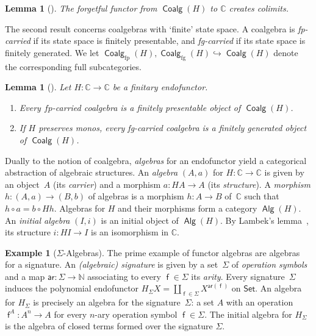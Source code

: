 \documentclass[10pt,a4paper]{article}
\newtheorem{lemma}[theorem]{Lemma}
\theoremstyle{definition}
\newtheorem{example}[theorem]{Example}
\theoremstyle{remark}
\numberwithin{equation}{section}
\providecommand{\catname}{\mathsf}
\providecommand{\oname}[1]{{\mathop{\mathsf{#1}}\xspace}}
\def\Set{\catname{Set}}
\newcommand{\ar}{\mathsf{ar}}
\providecommand{\C}{}
\newcommand{\fp}{{\mathrm{fp}}}
\newcommand{\fg}{{\mathrm{fg}}}
\renewcommand{\C}{{\mathbb{C}}}
\newcommand{\Nat}{\mathds{N}}
\newcommand{\f}{\oname{f}}
\DeclareMathOperator{\Coalg}{\mathsf{Coalg}}
\DeclareMathOperator{\Alg}{\mathsf{Alg}}
\newcommand{\subto}{\hookrightarrow}
\renewcommand{\Nat}{\mathbb{N}}
\newcommand{\gcat}{\mathbb{C}}
\newcommand{\resetCurThmBraces}{  \gdef\curThmBraceOpen{(}  \gdef\curThmBraceClose{)}}
\newcommand{\removeThmBraces}{  \gdef\curThmBraceOpen{}  \gdef\curThmBraceClose{}}
\newenvironment{notheorembrackets}{\removeThmBraces}{\resetCurThmBraces}
\theoremstyle{plain}
\theoremstyle{definition}
\begin{document}
\begin{notheorembrackets}
\begin{lemma}[{\cite[Prop.~4.7]{rutten00}}]\label{lem:colimits-coalg}
The forgetful functor from $\Coalg(H)$ to $\C$ creates colimits.
\end{lemma}
\end{notheorembrackets}

The second result concerns coalgebras with `finite' state space. A coalgebra is \emph{fp-carried} if its state space is finitely presentable, and \emph{fg-carried} if its state space is finitely generated. We let $\Coalg_\fp(H), \Coalg_\fg(H)\subto \Coalg(H)$ denote the corresponding full subcategories. 

\begin{notheorembrackets}
\begin{lemma}[{\cite[Lem.~3.2]{ap04}}]\label{lem:fp-fg-coalg} Let $H\colon \C\to \C$ be a finitary endofunctor.
\begin{enumerate}
\item Every $fp$-carried coalgebra is a finitely presentable object of $\Coalg(H)$.
\item If $H$ preserves monos, every fg-carried coalgebra is a finitely generated object of $\Coalg(H)$.
\end{enumerate}
\end{lemma}
\end{notheorembrackets}

Dually to the notion of coalgebra, \emph{algebras} for an endofunctor yield a categorical abstraction of algebraic structures. An \emph{algebra} $(A,a)$ for $H\colon \C\to \C$ is given by an object~$A$ (its \emph{carrier}) and a morphism $a\colon H A\to A$ (its \emph{structure}). A
\emph{morphism} $h\colon (A,a) \to (B,b)$ of algebras is a morphism
$h\colon A\to B$ of~$\gcat$ such that $h\circ a = b\circ H h$.  Algebras
for $H$ and their morphisms form a category $\Alg(H)$. An \emph{initial algebra} $(I,i)$ is an initial object of $\Alg(H)$. By Lambek's lemma~\cite{lambek68}, its structure $i\colon HI\to I$ is an isomorphism in $\C$.



\begin{example}[$\Sigma$-Algebras]
The prime example of functor algebras are algebras for a
signature. An \emph{(algebraic) signature} is given by a set~$\Sigma$
of \emph{operation symbols} and a map $\ar\colon \Sigma\to \Nat$
associating to every $\f\in \Sigma$ its \emph{arity}. Every
signature~$\Sigma$ induces the polynomial endofunctor $H_\Sigma X = \coprod_{\f\in \Sigma} X^{\ar(\f)}$ on $\Set$. An algebra for $H_\Sigma$ is
precisely an algebra for the signature~$\Sigma$: a set $A$ with an operation $\f^A\colon A^n\to A$ for every $n$-ary operation symbol $\f\in \Sigma$. The initial algebra for $H_\Sigma$ is the algebra of closed terms formed over the signature $\Sigma$.
\end{example}
\end{document}
